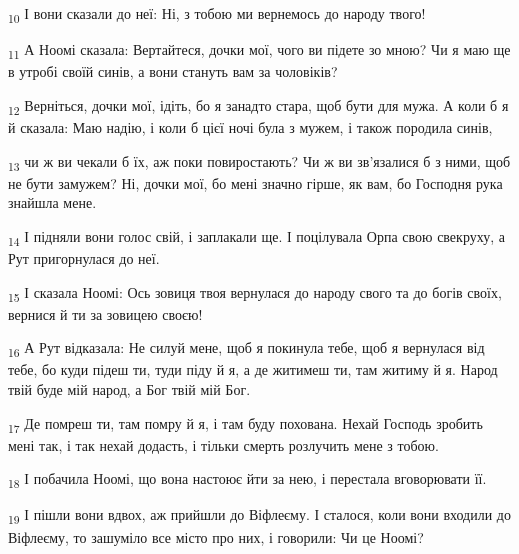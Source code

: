 \begin{tcolorbox}
\textsubscript{10} І вони сказали до неї: Ні, з тобою ми вернемось до народу твого!
\end{tcolorbox}
\begin{tcolorbox}
\textsubscript{11} А Ноомі сказала: Вертайтеся, дочки мої, чого ви підете зо мною? Чи я маю ще в утробі своїй синів, а вони стануть вам за чоловіків?
\end{tcolorbox}
\begin{tcolorbox}
\textsubscript{12} Верніться, дочки мої, ідіть, бо я занадто стара, щоб бути для мужа. А коли б я й сказала: Маю надію, і коли б цієї ночі була з мужем, і також породила синів,
\end{tcolorbox}
\begin{tcolorbox}
\textsubscript{13} чи ж ви чекали б їх, аж поки повиростають? Чи ж ви зв'язалися б з ними, щоб не бути замужем? Ні, дочки мої, бо мені значно гірше, як вам, бо Господня рука знайшла мене.
\end{tcolorbox}
\begin{tcolorbox}
\textsubscript{14} І підняли вони голос свій, і заплакали ще. І поцілувала Орпа свою свекруху, а Рут пригорнулася до неї.
\end{tcolorbox}
\begin{tcolorbox}
\textsubscript{15} І сказала Ноомі: Ось зовиця твоя вернулася до народу свого та до богів своїх, вернися й ти за зовицею своєю!
\end{tcolorbox}
\begin{tcolorbox}
\textsubscript{16} А Рут відказала: Не силуй мене, щоб я покинула тебе, щоб я вернулася від тебе, бо куди підеш ти, туди піду й я, а де житимеш ти, там житиму й я. Народ твій буде мій народ, а Бог твій мій Бог.
\end{tcolorbox}
\begin{tcolorbox}
\textsubscript{17} Де помреш ти, там помру й я, і там буду похована. Нехай Господь зробить мені так, і так нехай додасть, і тільки смерть розлучить мене з тобою.
\end{tcolorbox}
\begin{tcolorbox}
\textsubscript{18} І побачила Ноомі, що вона настоює йти за нею, і перестала вговорювати її.
\end{tcolorbox}
\begin{tcolorbox}
\textsubscript{19} І пішли вони вдвох, аж прийшли до Віфлеєму. І сталося, коли вони входили до Віфлеєму, то зашуміло все місто про них, і говорили: Чи це Ноомі?
\end{tcolorbox}

